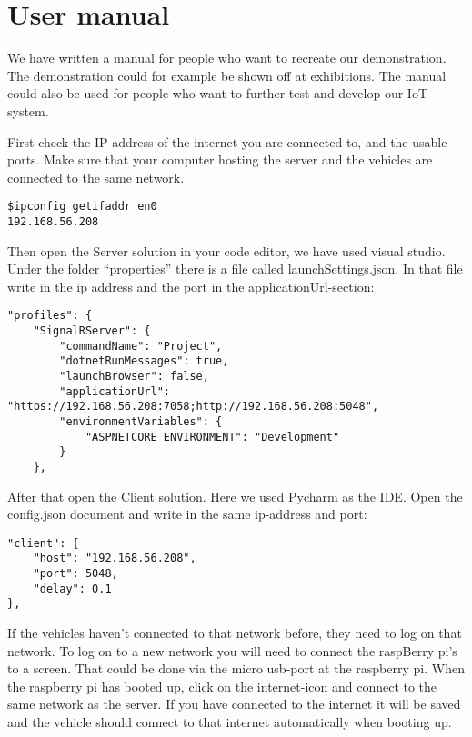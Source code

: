 \section{User manual}
We have written a manual for people who want to recreate our demonstration. The demonstration could for example be shown off at exhibitions. The manual could also be used for people who want to further test and develop our IoT-system.

First check the IP-address of the internet you are connected to, and the usable ports. Make sure that your computer hosting the server and the vehicles are connected to the same network.

\begin{lstlisting}
$ipconfig getifaddr en0
192.168.56.208
\end{lstlisting}

Then open the Server solution in your code editor, we have used visual studio. Under the folder “properties” there is a file called launchSettings.json. In that file write in the ip address and the port in the applicationUrl-section:

\clearpage
\begin{lstlisting}
"profiles": {
	"SignalRServer": {
		"commandName": "Project",
		"dotnetRunMessages": true,
		"launchBrowser": false,
		"applicationUrl": "https://192.168.56.208:7058;http://192.168.56.208:5048",
		"environmentVariables": {
			"ASPNETCORE_ENVIRONMENT": "Development"
		}
	},
\end{lstlisting}

After that open the Client solution. Here we used Pycharm as the IDE. Open the config.json document and write in the same ip-address and port:

\begin{lstlisting}
"client": {
	"host": "192.168.56.208",
	"port": 5048,
	"delay": 0.1
},
\end{lstlisting}

If the vehicles haven’t connected to that network before, they need to log on that network. To log on to a new network you will need to connect the raspBerry pi’s to a screen. That could be done via the micro usb-port at the raspberry pi. When the raspberry pi has booted up, click on the internet-icon and connect to the same network as the server. If you have connected to the internet it will be saved and the vehicle should connect to that internet automatically when booting up. 

